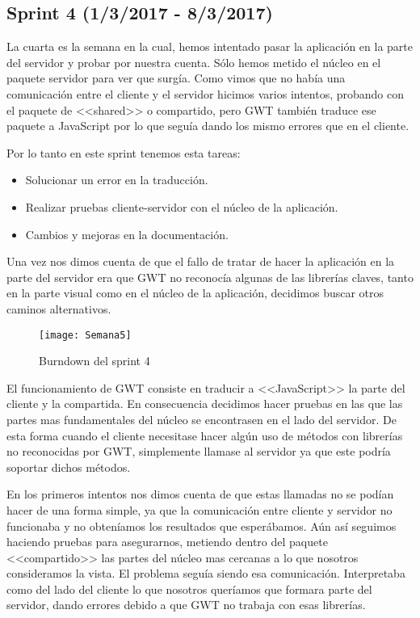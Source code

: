 \subsection{Sprint 4 (1/3/2017 - 8/3/2017)}
La cuarta es la semana en la cual, hemos intentado pasar la aplicación en la parte del servidor y probar por nuestra cuenta. Sólo hemos metido el núcleo en el paquete servidor para ver que surgía. Como vimos que no había una comunicación entre el cliente y el servidor hicimos varios intentos, probando con el paquete de <<shared>> o compartido, pero GWT también traduce ese paquete a JavaScript por lo que seguía dando los mismo errores que en el cliente.

Por lo tanto en este sprint tenemos esta tareas:

\begin{itemize}
\item Solucionar un error en la traducción.
\item Realizar pruebas cliente-servidor con el núcleo de la aplicación.
\item Cambios y mejoras en la documentación.
\end{itemize}

Una vez nos dimos cuenta de que el fallo de tratar de hacer la aplicación en la parte del servidor era que GWT no reconocía algunas de las librerías claves, tanto en la parte visual como en el núcleo de la aplicación, decidimos buscar otros caminos alternativos. 


\begin{figure}[h]
\centering
\texttt{[image: Semana5]}
\caption{Burndown del sprint 4}
\label{fig:A.3}
\end{figure}

El funcionamiento de GWT consiste en traducir a <<JavaScript>> la parte del cliente y la compartida. En consecuencia decidimos hacer pruebas en las que las partes mas fundamentales del núcleo se encontrasen en el lado del servidor. De esta forma cuando el cliente necesitase hacer algún uso de métodos con librerías no reconocidas por GWT, simplemente llamase al servidor ya que este podría soportar dichos métodos. 

En los primeros intentos nos dimos cuenta de que estas llamadas no se podían hacer de una forma simple, ya que la comunicación entre cliente y servidor no funcionaba y no obteníamos los resultados que esperábamos. Aún así seguimos haciendo pruebas para asegurarnos, metiendo dentro del paquete <<compartido>> las partes del núcleo mas cercanas a lo que nosotros consideramos la vista. El problema seguía siendo esa comunicación. Interpretaba como del lado del cliente lo que nosotros queríamos que formara parte del servidor, dando errores debido a que GWT no trabaja con esas librerías.

